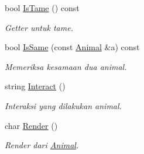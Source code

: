 \begin{DoxyCompactItemize}
bool \hyperlink{classAnimal_ae429a0c8a9f170793f61fefe9cca8c72}{Is\+Tame} () const 
\begin{DoxyCompactList}\small\item\em Getter untuk tame. \end{DoxyCompactList}\item 
bool \hyperlink{classAnimal_afc66abcbc6efb71c81d5306ea368cffb}{Is\+Same} (const \hyperlink{classAnimal}{Animal} \&a) const 
\begin{DoxyCompactList}\small\item\em Memeriksa kesamaan dua animal. \end{DoxyCompactList}\item 
string \hyperlink{classAnimal_a7303717426fc66292257a75e737822fb}{Interact} ()
\begin{DoxyCompactList}\small\item\em Interaksi yang dilakukan animal. \end{DoxyCompactList}\item 
char \hyperlink{classAnimal_a0c8bf63a558039095c06ccb369f1ddda}{Render} ()
\begin{DoxyCompactList}\small\item\em Render dari \hyperlink{classAnimal}{Animal}. \end{DoxyCompactList}\end{DoxyCompactItemize}

